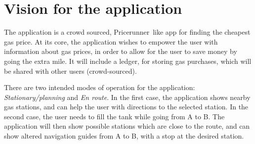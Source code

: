 
\chapter{Vision for the application}
The application is a crowd sourced, Pricerunner\texttrademark\ like app for finding the cheapest gas price. At its core, the application wishes to empower the user with information about gas prices, in order to allow for the user to save money by going the extra mile. It will include a ledger, for storing gas purchases, which will be shared with other users (crowd-sourced).

There are two intended modes of operation for the application: \emph{Stationary/planning} and \emph{En route}. In the first case, the application shows nearby gas stations, and can help the user with directions to the selected station. In the second case, the user needs to fill the tank while going from A to B. The application will then show possible stations which are close to the route, and can show altered navigation guides from A to B, with a stop at the desired station.
